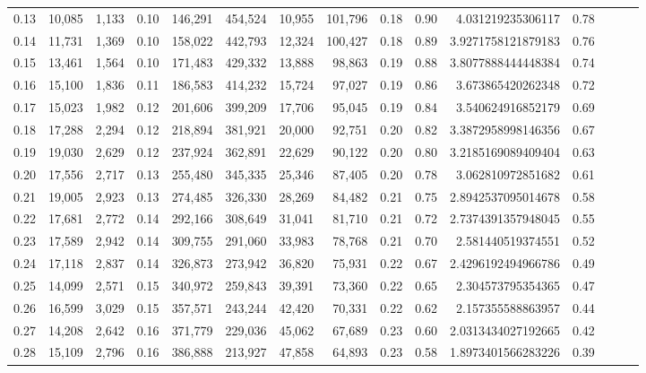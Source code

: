 \begin{tabular}{rrrrrrrrrrrrrrr}
0.13 &  10,085 &  1,133 &  0.10 &  146,291 &  454,524 &   10,955 &  101,796 &  0.18 &  0.90 &       4.031219235306117 &      0.78 \\
0.14 &  11,731 &  1,369 &  0.10 &  158,022 &  442,793 &   12,324 &  100,427 &  0.18 &  0.89 &      3.9271758121879183 &      0.76 \\
0.15 &  13,461 &  1,564 &  0.10 &  171,483 &  429,332 &   13,888 &   98,863 &  0.19 &  0.88 &      3.8077888444448384 &      0.74 \\
0.16 &  15,100 &  1,836 &  0.11 &  186,583 &  414,232 &   15,724 &   97,027 &  0.19 &  0.86 &       3.673865420262348 &      0.72 \\
0.17 &  15,023 &  1,982 &  0.12 &  201,606 &  399,209 &   17,706 &   95,045 &  0.19 &  0.84 &       3.540624916852179 &      0.69 \\
0.18 &  17,288 &  2,294 &  0.12 &  218,894 &  381,921 &   20,000 &   92,751 &  0.20 &  0.82 &      3.3872958998146356 &      0.67 \\
0.19 &  19,030 &  2,629 &  0.12 &  237,924 &  362,891 &   22,629 &   90,122 &  0.20 &  0.80 &      3.2185169089409404 &      0.63 \\
0.20 &  17,556 &  2,717 &  0.13 &  255,480 &  345,335 &   25,346 &   87,405 &  0.20 &  0.78 &       3.062810972851682 &      0.61 \\
0.21 &  19,005 &  2,923 &  0.13 &  274,485 &  326,330 &   28,269 &   84,482 &  0.21 &  0.75 &      2.8942537095014678 &      0.58 \\
0.22 &  17,681 &  2,772 &  0.14 &  292,166 &  308,649 &   31,041 &   81,710 &  0.21 &  0.72 &      2.7374391357948045 &      0.55 \\
0.23 &  17,589 &  2,942 &  0.14 &  309,755 &  291,060 &   33,983 &   78,768 &  0.21 &  0.70 &       2.581440519374551 &      0.52 \\
0.24 &  17,118 &  2,837 &  0.14 &  326,873 &  273,942 &   36,820 &   75,931 &  0.22 &  0.67 &      2.4296192494966786 &      0.49 \\
0.25 &  14,099 &  2,571 &  0.15 &  340,972 &  259,843 &   39,391 &   73,360 &  0.22 &  0.65 &       2.304573795354365 &      0.47 \\
0.26 &  16,599 &  3,029 &  0.15 &  357,571 &  243,244 &   42,420 &   70,331 &  0.22 &  0.62 &       2.157355588863957 &      0.44 \\
0.27 &  14,208 &  2,642 &  0.16 &  371,779 &  229,036 &   45,062 &   67,689 &  0.23 &  0.60 &      2.0313434027192665 &      0.42 \\
0.28 &  15,109 &  2,796 &  0.16 &  386,888 &  213,927 &   47,858 &   64,893 &  0.23 &  0.58 &      1.8973401566283226 &      0.39 \\

\end{tabular}
